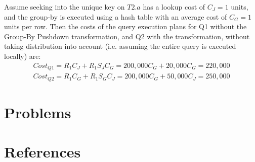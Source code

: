 \documentclass[11pt]{article}
\begin{document}
Assume seeking into the unique key on \(T2.a\) has a lookup cost of \(C_J=1\) units, and the group-by
is executed using a hash table with an average cost of \(C_G=1\) units per row. Then the costs of the
query execution plans for Q1 without the Group-By Pushdown transformation, and Q2 with the
transformation, without taking distribution into account (i.e. assuming the entire query is executed
locally) are:
\begin{gather*}
Cost_{Q1}=R_1C_J+R_1S_JC_G=200,000C_G+20,000C_G=220,000\\
Cost_{Q2}=R_1C_G+R_1S_GC_J=200,000C_G+50,000C_J=250,000
\end{gather*}
\section{Problems}
\label{sec:orgc302221}


\section{References}
\label{sec:org604a3f0}
\label{bibliographystyle link}



\end{document}
